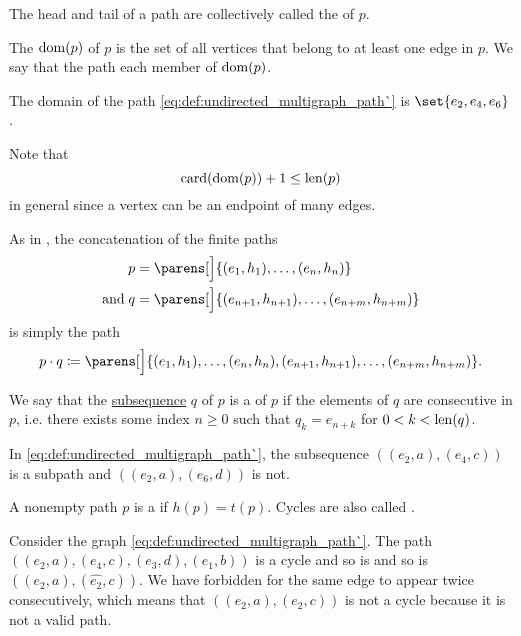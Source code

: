 \begin{definition}
\begin{thmenum}
    The head and tail of a path are collectively called the  of \( p \).

     The  \( \operatorname{dom}(p) \) of \( p \) is the set of all vertices that belong to at least one edge in \( p \). We say that the path  each member of \( \operatorname{dom}(p) \).

    The domain of the path \eqref{eq:def:undirected_multigraph_path`} is \( \set{ e_2, e_4, e_6 } \).

    Note that
    \begin{equation}\label{eq:def:undirected_multigraph_path/length_and_domain}
      \operatorname{card}(\operatorname{dom}(p)) + 1 \leq \operatorname{len}(p)
    \end{equation}
    in general since a vertex can be an endpoint of many edges.

     As in , the concatenation of the finite paths
    \begin{align*}
              p &= \parens[\Big]{ (e_1, h_1), \ldots, (e_n, h_n) } \\
      \T{and} q &= \parens[\Big]{ (e_{n+1}, h_{n+1}), \ldots, (e_{n+m}, h_{n+m}) }
    \end{align*}
    is simply the path
    \begin{equation*}
      p \cdot q \coloneqq \parens[\Big]{ (e_1, h_1), \ldots, (e_n, h_n), (e_{n+1}, h_{n+1}), \ldots, (e_{n+m}, h_{n+m}) }.
    \end{equation*}

     We say that the \hyperref[def:subsequence]{subsequence} \( q \) of \( p \) is a  of \( p \) if the elements of \( q \) are consecutive in \( p \), i.e. there exists some index \( n \geq 0 \) such that \( q_k = e_{n + k} \) for \( 0 < k < \operatorname{len}(q) \).

    In \eqref{eq:def:undirected_multigraph_path`}, the subsequence \( ((e_2, a), (e_4, c)) \) is a subpath and \( ((e_2, a), (e_6, d)) \) is not.

     A nonempty path \( p \) is a  if \( h(p) = t(p) \). Cycles are also called .

    Consider the graph \eqref{eq:def:undirected_multigraph_path`}. The path \( ((e_2, a), (e_4, c), (e_3, d), (e_1, b)) \) is a cycle and so is and so is \( ((e_2, a), (\widehat{e_2}, c)) \). We have forbidden for the same edge to appear twice consecutively, which means that \( ((e_2, a), (e_2, c)) \) is not a cycle because it is not a valid path.


\end{thmenum}
\end{definition}

